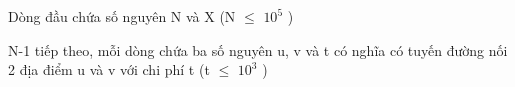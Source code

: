 Dòng đầu chứa số nguyên N và X (N  $\le$  $10^{5}$ )


N-1 tiếp theo, mỗi dòng chứa ba số nguyên u, v và t có nghĩa có tuyến đường nối 2 địa điểm u và v với chi phí t (t  $\le$  $10^{3}$ )